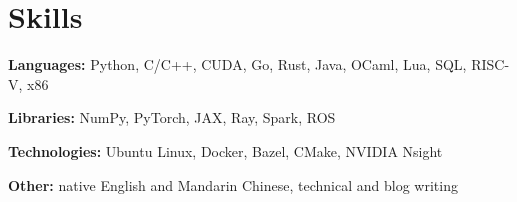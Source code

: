 \documentclass[letterpaper,11pt]{article}
\newcommand{\resumeSubHeadingListStart}{\begin{itemize}[leftmargin=0.15in, label={}]}
\newcommand{\resumeSubHeadingListEnd}{\end{itemize}}
\begin{document}








 
\section{Skills}
  \vspace{2pt}
  \resumeSubHeadingListStart
    \small{\item{
        \textbf{Languages: }{Python, C/C++, CUDA, Go, Rust, Java, OCaml, Lua, SQL, RISC-V, x86} \\ \vspace{3pt}
        
        \textbf{Libraries: }{NumPy, PyTorch, JAX, Ray, Spark, ROS} \\ \vspace{3pt}
        
        \textbf{Technologies: }{Ubuntu Linux, Docker, Bazel, CMake, NVIDIA Nsight} \\ \vspace{3pt}

        \textbf{Other: }{native English and Mandarin Chinese, technical and blog writing}
    }}
  \resumeSubHeadingListEnd
\end{document}
